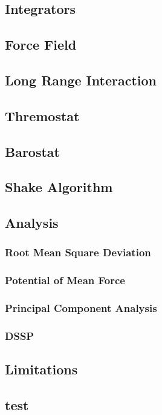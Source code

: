 \documentclass[12pts,a4paper,openany]{book}
\begin{document}
	\section{Integrators}
	\section{Force Field}
	\section{Long Range Interaction}
	\section{Thremostat}
	\section{Barostat}
	\section{Shake Algorithm}
	\section{Analysis}
		\subsection{Root Mean Square Deviation}
		\subsection{Potential of Mean Force}
		\subsection{Principal Component Analysis}
		\subsection{DSSP}
	\section{Limitations}






\begin{appendices}
	\chapter{test}
\end{appendices}
\end{document}
